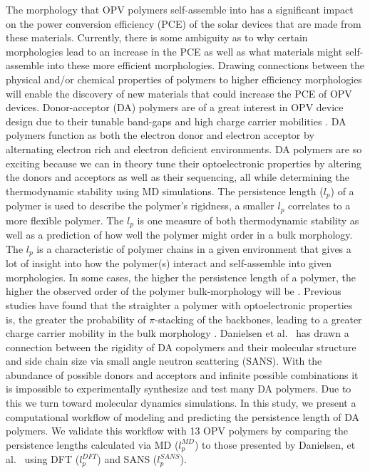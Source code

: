 The morphology that OPV polymers self-assemble into has a significant impact on the power conversion efficiency (PCE) of the solar devices that are made from these materials. Currently,  there is some ambiguity as to why certain morphologies lead to an increase in the PCE as well as what materials might self-assemble into these more efficient morphologies. Drawing connections between the physical and/or chemical properties of polymers to higher efficiency morphologies will enable the discovery of new materials that could increase the PCE of OPV devices. Donor-acceptor (DA) polymers are of a great interest in OPV device design due to their tunable band-gaps and high charge carrier mobilities \citep{sarap_electronic_2023}. DA polymers function as both the electron donor and electron acceptor by alternating electron rich and electron deficient environments. DA polymers are so exciting because we can in theory tune their optoelectronic properties by altering the donors and acceptors as well as their sequencing, all while determining the thermodynamic stability using MD simulations. The persistence length ($l_p$) of a polymer is used to describe the polymer's rigidness, a smaller $l_p$ correlates to a more flexible polymer. The $l_p$ is one measure of both thermodynamic stability as well as a prediction of how well the polymer might order in a bulk morphology. The $l_p$ is a characteristic of polymer chains in a given environment that gives a lot of insight into how the polymer(s) interact and self-assemble into given morphologies. In some cases, the higher the persistence length of a polymer, the higher the observed order of the polymer bulk-morphology will be \citep{martin_temperature-dependence_2018}. Previous studies have found that the straighter a polymer with optoelectronic properties is, the greater the probability of $\pi$-stacking of the backbones, leading to a greater charge carrier mobility in the bulk morphology \citep{Himmelberger_Salleo_2015}. Danielsen et al.~ has drawn a connection between the rigidity of DA copolymers and their molecular structure and side chain size via small angle neutron scattering (SANS). With the abundance of possible donors and acceptors and infinite possible combinations it is impossible to experimentally synthesize and test many DA polymers. Due to this we turn toward molecular dynamics simulations. In this study, we present a computational workflow of modeling and predicting the persistence length of DA polymers. We validate this workflow with 13 OPV polymers by comparing the persistence lengths calculated via MD ($l_p^{MD}$) to those presented by Danielsen, et al.~ using DFT ($l_p^{DFT}$) and SANS ($l_p^{SANS}$). 

